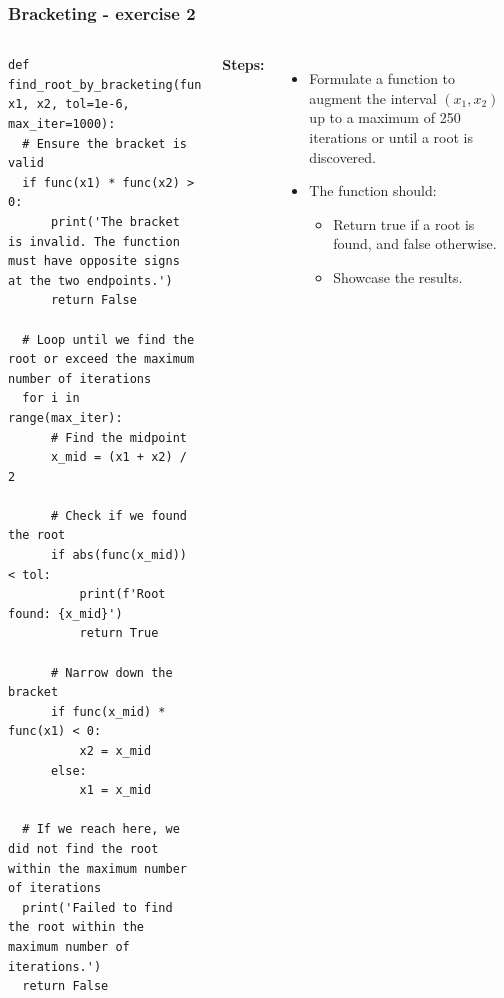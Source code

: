 \begin{frame}[fragile]
  \frametitle{Bracketing - exercise 2}

  \begin{columns}
    \begin{lstlisting}[style=tiny]
def find_root_by_bracketing(func, x1, x2, tol=1e-6, max_iter=1000):
  # Ensure the bracket is valid
  if func(x1) * func(x2) > 0:
      print('The bracket is invalid. The function must have opposite signs at the two endpoints.')
      return False

  # Loop until we find the root or exceed the maximum number of iterations
  for i in range(max_iter):
      # Find the midpoint
      x_mid = (x1 + x2) / 2
      
      # Check if we found the root
      if abs(func(x_mid)) < tol:
          print(f'Root found: {x_mid}')
          return True
      
      # Narrow down the bracket
      if func(x_mid) * func(x1) < 0:
          x2 = x_mid
      else:
          x1 = x_mid

  # If we reach here, we did not find the root within the maximum number of iterations
  print('Failed to find the root within the maximum number of iterations.')
  return False
      \end{lstlisting}
    \textbf{Steps:}
    \begin{itemize}
      \item Formulate a function to augment the interval \((x_1, x_2)\) up to a maximum of 250 iterations or until a root is discovered.
      \item The function should:
            \begin{itemize}
              \item Return true if a root is found, and false otherwise.
              \item Showcase the results.
            \end{itemize}
    \end{itemize}
  \end{columns}
\end{frame}

